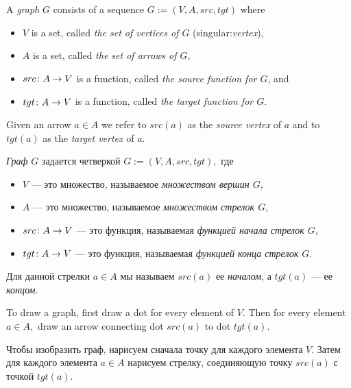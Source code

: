 \documentclass[../main/CT4S-EN-RU]{subfiles}
\begin{document}
\begin{definitionENG}\label{def:graph}
A {\em graph} $G$ consists of a sequence $G:=(V,A,src,tgt)$ where 
\begin{itemize}
\item $V$ is a set, called {\em the set of vertices of $G$} (singular:{\em vertex}),
\item $A$ is a set, called {\em the set of arrows of $G$},
\item $src\colon A\rightarrow V$ is a function, called {\em the source function for $G$}, and
\item $tgt\colon A\rightarrow V$ is a function, called {\em the target function for $G$}.
\end{itemize}
Given an arrow $a\in A$ we refer to $src(a)$ as the {\em source vertex} of $a$ and to $tgt(a)$ as the {\em target vertex} of $a.$
\end{definitionENG}

\begin{definitionRUS}\label{def:graph}
{\em Граф} $G$ задается четверкой $G:=(V,A,src,tgt),$ где
\begin{itemize}
\item $V$ — это множество, называемое {\em множеством вершин $G$},
\item $A$ — это множество, называемое {\em множеством стрелок $G$},
\item $src\colon A\rightarrow V$ — это функция, называемая {\em функцией начала стрелок $G$},
\item $tgt\colon A\rightarrow V$ — это функция, называемая {\em функцией конца стрелок $G$}.
\end{itemize}
Для данной стрелки $a\in A$ мы называем $src(a)$ ее {\em началом}, а $tgt(a)$ — ее {\em концом}.
\end{definitionRUS}

\begin{blockENG}
To draw a graph, first draw a dot for every element of $V.$ Then for every element $a\in A,$ draw an arrow connecting dot $src(a)$ to dot $tgt(a).$
\end{blockENG}

\begin{blockRUS}
Чтобы изобразить граф, нарисуем сначала точку для каждого элемента $V.$ Затем для каждого элемента $a\in A$ нарисуем стрелку, соединяющую точку $src(a)$ с точкой $tgt(a).$
\end{blockRUS}
\end{document}
